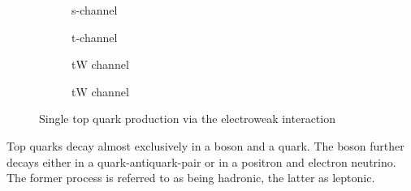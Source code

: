 \begin{figure}[H]
    \centering
    \begin{subfigure}[t]{0.2\textwidth}
        \centering
        
        \caption{s-channel}
        \label{fig:top_single_s}
    \end{subfigure}\hfill
    \begin{subfigure}[t]{0.2\textwidth}
        \centering
        
        \caption{t-channel}
        \label{fig:top_single_t}
    \end{subfigure}\hfill
    \begin{subfigure}[t]{0.2\textwidth}
        \centering
        
        \caption{tW channel}
        \label{fig:top_single_tw_1}
    \end{subfigure}\hfill
    \begin{subfigure}[t]{0.2\textwidth}
        \centering
        
        \caption{tW channel}
        \label{fig:top_single_tw_2}
    \end{subfigure}
    \caption{Single top quark production via the electroweak interaction}
    \label{fig:top_single}
\end{figure}
Top quarks decay almost exclusively in a \PWplus boson and a \Pbottom quark. The boson further decays either in a quark-antiquark-pair or in a positron and electron neutrino. The former process is referred to as being hadronic, the latter as leptonic.
